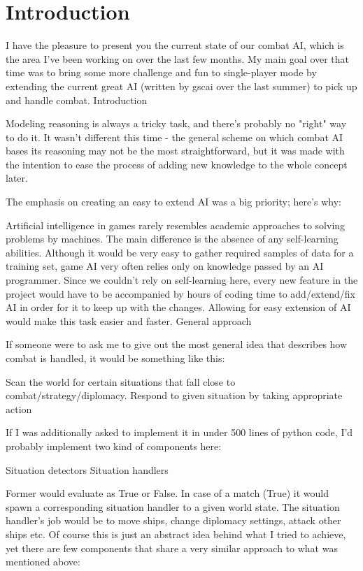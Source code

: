 \chapter{Introduction}

I have the pleasure to present you the current state of our combat AI, which is the area I've been working on over the last few months.
My main goal over that time was to bring some more challenge and fun to single-player mode by extending the current great AI (written by gscai over the last summer) to pick up and handle combat.
Introduction

Modeling reasoning is always a tricky task, and there's probably no "right" way to do it.
It wasn't different this time - the general scheme on which combat AI bases its reasoning may not be the most straightforward, but it was made with the intention to ease the process of adding new knowledge to the whole concept later.

The emphasis on creating an easy to extend AI was a big priority; here's why:

Artificial intelligence in games rarely resembles academic approaches to solving problems by machines.
The main difference is the absence of any self-learning abilities.
Although it would be very easy to gather required samples of data for a training set, game AI very often relies only on knowledge passed by an AI programmer.
Since we couldn't rely on self-learning here, every new feature in the project would have to be accompanied by hours of coding time to add/extend/fix AI in order for it to keep up with the changes.
Allowing for easy extension of AI would make this task easier and faster.
General approach

If someone were to ask me to give out the most general idea that describes how combat is handled, it would be something like this:

    Scan the world for certain situations that fall close to combat/strategy/diplomacy.
    Respond to given situation by taking appropriate action

If I was additionally asked to implement it in under 500 lines of python code, I'd probably implement two kind of components here:

    Situation detectors
    Situation handlers

Former would evaluate as True or False.
In case of a match (True) it would spawn a corresponding situation handler to a given world state.
The situation handler's job would be to move ships, change diplomacy settings, attack other ships etc.
Of course this is just an abstract idea behind what I tried to achieve, yet there are few components that share a very similar approach to what was mentioned above:


